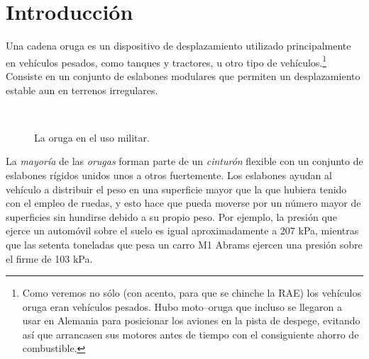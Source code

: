 \section{Introducción}

Una cadena oruga es un dispositivo de desplazamiento utilizado
principalmente en vehículos pesados, como tanques y tractores, u otro
tipo de vehículos.\footnote{Como veremos no sólo (con acento, para que
  se chinche la RAE) los vehículos oruga eran vehículos pesados. Hubo
  moto--oruga que incluso se llegaron a usar en Alemania para
  posicionar los aviones en la pista de despege, evitando así que
  arrancasen sus motores antes de tiempo con el consiguiente ahorro de
  combustible.} Consiste en un conjunto de eslabones modulares que
permiten un desplazamiento estable aun en terrenos irregulares.

\begin{figure}[!hbp]
\centering
\mbox{
\qquad
{}
}
\caption{\label{fig:militar} La oruga en el uso militar.}
\end{figure}

La {\it mayoría} de las \textit{orugas} forman parte de un
\emph{cinturón} flexible con un conjunto de eslabones rígidos unidos
unos a otros fuertemente. Los eslabones ayudan al vehículo a
distribuir el peso en una superficie mayor que la que hubiera tenido
con el empleo de ruedas, y esto hace que pueda moverse por un número
mayor de superficies sin hundirse debido a su propio peso. Por
ejemplo, la presión que ejerce un automóvil sobre el suelo es igual
aproximadamente a 207 kPa, mientras que las setenta toneladas que pesa
un carro M1 Abrams ejercen una presión sobre el firme de 103 kPa.

